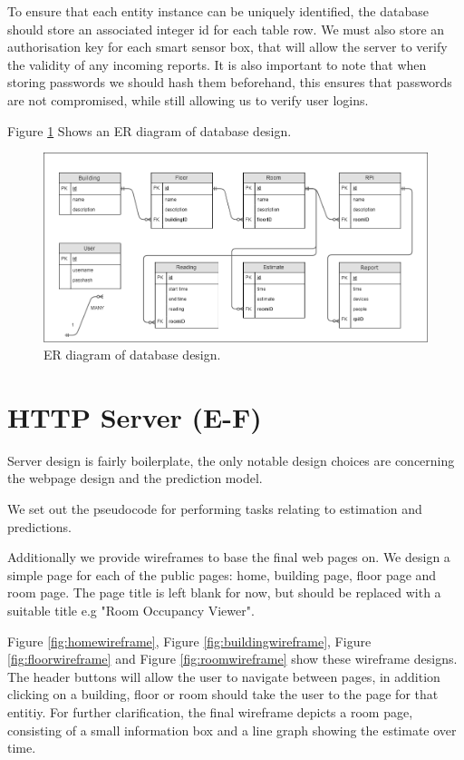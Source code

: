 \documentclass{l4proj}
\begin{document}
To ensure that each entity instance can be uniquely identified, the database should store an associated integer id for each table row.
We must also store an authorisation key for each smart sensor box, that will allow the server to verify the validity of any incoming reports.
It is also important to note that when storing passwords we should hash them beforehand, this ensures that passwords are not compromised, while still allowing us to verify user logins.

Figure \ref{fig:ERdiagram} Shows an ER diagram of database design.



\begin{figure}
\centering
\includegraphics[width=\textwidth]{ERdiagram}
\caption{ER diagram of database design.}
\label{fig:ERdiagram}
\end{figure}



\section{HTTP Server (E-F)}

Server design is fairly boilerplate, the only notable design choices are concerning the webpage design and the prediction model.

We set out the pseudocode for performing tasks relating to estimation and predictions.

Additionally we provide wireframes to base the final web pages on. We design a simple page for each of the public pages: home, building page, floor page and room page. The page title is left blank for now, but should be replaced with a suitable title e.g "Room Occupancy Viewer".

Figure \ref{fig:homewireframe}, Figure \ref{fig:buildingwireframe}, Figure \ref{fig:floorwireframe} and Figure \ref{fig:roomwireframe} show these wireframe designs. The header buttons will allow the user to navigate between pages, in addition clicking on a building, floor or room should take the user to the page for that entitiy. For further clarification, the final wireframe depicts a room page, consisting of a small information box and a line graph showing the estimate over time.
\end{document}
